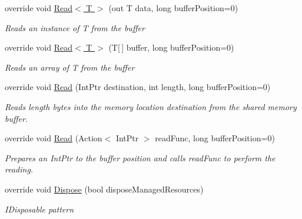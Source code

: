 \begin{DoxyCompactItemize}
override void \hyperlink{class_shared_memory_1_1_buffer_with_locks_a1c83bd463abef7c618efdcbe6e9fb317}{Read$<$ T $>$} (out T data, long buffer\+Position=0)
\begin{DoxyCompactList}\small\item\em Reads an instance of {\itshape T}  from the buffer \end{DoxyCompactList}\item 
override void \hyperlink{class_shared_memory_1_1_buffer_with_locks_a247e1e8f8f2849b65ee985f3b08cca97}{Read$<$ T $>$} (T\mbox{[}$\,$\mbox{]} buffer, long buffer\+Position=0)
\begin{DoxyCompactList}\small\item\em Reads an array of {\itshape T}  from the buffer \end{DoxyCompactList}\item 
override void \hyperlink{class_shared_memory_1_1_buffer_with_locks_adf97b7891d30d2cc24ea39e232a0b238}{Read} (Int\+Ptr destination, int length, long buffer\+Position=0)
\begin{DoxyCompactList}\small\item\em Reads {\itshape length}  bytes into the memory location {\itshape destination}  from the shared memory buffer. \end{DoxyCompactList}\item 
override void \hyperlink{class_shared_memory_1_1_buffer_with_locks_a61d2f003963ccbedaff237c69814104d}{Read} (Action$<$ Int\+Ptr $>$ read\+Func, long buffer\+Position=0)
\begin{DoxyCompactList}\small\item\em Prepares an Int\+Ptr to the buffer position and calls {\itshape read\+Func}  to perform the reading. \end{DoxyCompactList}\item 
override void \hyperlink{class_shared_memory_1_1_buffer_with_locks_a3b01026691fcd0c1b2088ebabb0780d4}{Dispose} (bool dispose\+Managed\+Resources)
\begin{DoxyCompactList}\small\item\em I\+Disposable pattern \end{DoxyCompactList}\end{DoxyCompactItemize}

